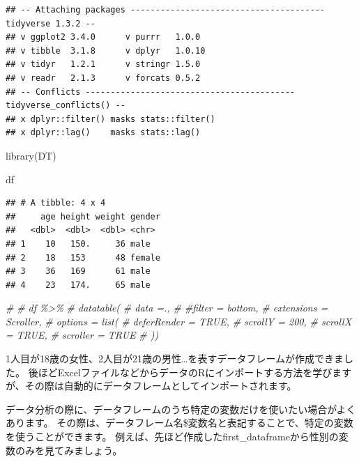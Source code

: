 \documentclass[
]{book}
\newenvironment{Shaded}{\begin{snugshade}}{\end{snugshade}}
\newcommand{\CommentTok}[1]{\textcolor[rgb]{0.56,0.35,0.01}{\textit{#1}}}
\newcommand{\FunctionTok}[1]{\textcolor[rgb]{0.00,0.00,0.00}{#1}}
\newcommand{\NormalTok}[1]{#1}
\begin{document}
\begin{verbatim}
## -- Attaching packages --------------------------------------- tidyverse 1.3.2 --
## v ggplot2 3.4.0      v purrr   1.0.0 
## v tibble  3.1.8      v dplyr   1.0.10
## v tidyr   1.2.1      v stringr 1.5.0 
## v readr   2.1.3      v forcats 0.5.2 
## -- Conflicts ------------------------------------------ tidyverse_conflicts() --
## x dplyr::filter() masks stats::filter()
## x dplyr::lag()    masks stats::lag()
\end{verbatim}

\begin{Shaded}
\begin{Highlighting}[]
\FunctionTok{library}\NormalTok{(DT)}



\NormalTok{df}
\end{Highlighting}
\end{Shaded}

\begin{verbatim}
## # A tibble: 4 x 4
##     age height weight gender
##   <dbl>  <dbl>  <dbl> <chr> 
## 1    10   150.     36 male  
## 2    18   153      48 female
## 3    36   169      61 male  
## 4    23   174.     65 male
\end{verbatim}

\begin{Shaded}
\begin{Highlighting}[]
\CommentTok{\# }
\CommentTok{\# df \%\textgreater{}\%}
\CommentTok{\#   datatable(}
\CommentTok{\#     data =., }
\CommentTok{\#     \#filter = \textquotesingle{}bottom\textquotesingle{},}
\CommentTok{\#     extensions = \textquotesingle{}Scroller\textquotesingle{},}
\CommentTok{\#     options = list(}
\CommentTok{\#     deferRender = TRUE,}
\CommentTok{\#     scrollY = 200,}
\CommentTok{\#     scrollX = TRUE,}
\CommentTok{\#     scroller = TRUE}
\CommentTok{\#   ))}
\end{Highlighting}
\end{Shaded}

1人目が18歳の女性、2人目が21歳の男性\ldots を表すデータフレームが作成できました。 後ほどExcelファイルなどからデータのRにインポートする方法を学びますが、その際は自動的にデータフレームとしてインポートされます。

データ分析の際に、データフレームのうち特定の変数だけを使いたい場合がよくあります。 その際は、データフレーム名\$変数名と表記することで、特定の変数を使うことができます。 例えば、先ほど作成したfirst\_dataframeから性別の変数のみを見てみましょう。
\end{document}
